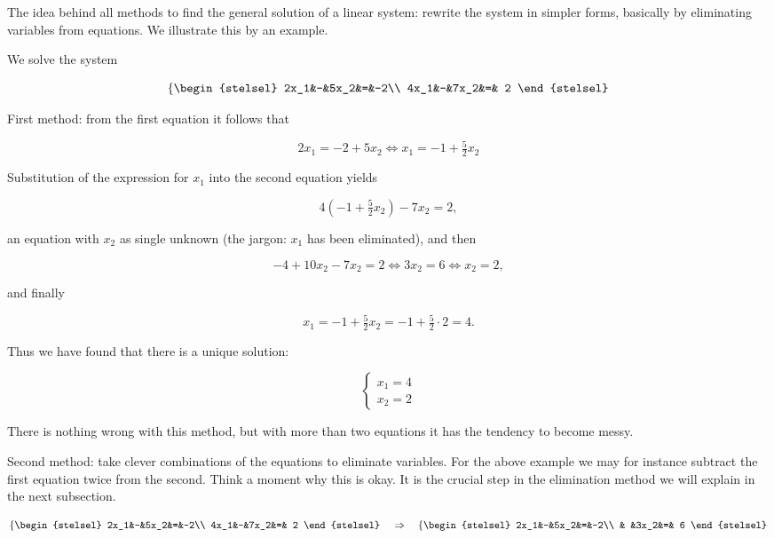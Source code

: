 The idea behind all methods to find the general solution of a linear system: rewrite the system in simpler forms, basically by eliminating variables from equations.
We illustrate this by an example.

\begin{ex}
\label{Ex:LinSystems:SolWithBacksubst1}
We solve the system

$$

   \left\{
\begin{stelsel}
    2x_1&-&5x_2&=&-2\\
    4x_1&-&7x_2&=& 2
    \end{stelsel}\right.
$$

First method:  from the first equation it follows that

$$

  2x_1 = -2 + 5x_2 \iff x_1 = -1 + \tfrac52 x_2
$$

Substitution of the expression for $x_1$ into the second equation yields

$$

  4(-1 + \tfrac52 x_2) - 7x_2 = 2,
$$

an equation with $x_2$ as single unknown   (the jargon:  $x_1$ has been eliminated), and  then

$$

  -4 +10x_2 - 7x_2 = 2 \iff 3x_2 = 6 \iff x_2 = 2,
$$

and finally

$$

  x_1 = -1 + \tfrac52 x_2 = -1 + \tfrac52\cdot2 = 4.
$$

Thus we have found that there is a unique solution:

$$

    \left\{
\begin{array}{l} x_1 = 4 \\ x_2 = 2 \end{array} \right.
$$

There is nothing wrong with this method, but with more than two equations it has the tendency to become messy.

Second method:  take clever combinations of the equations to eliminate variables.  For the above example  we may for instance subtract the first equation twice from the second.  Think a moment why this is okay. It is the crucial step in the elimination method we will explain in the next subsection.

$$

   \left\{
\begin{stelsel}
        2x_1&-&5x_2&=&-2\\
        4x_1&-&7x_2&=& 2
    \end{stelsel}\right. \quad\Rightarrow\quad
     \left\{
\begin{stelsel}
        2x_1&-&5x_2&=&-2\\
            & &3x_2&=& 6
    \end{stelsel}\right.
$$


\end{ex}

